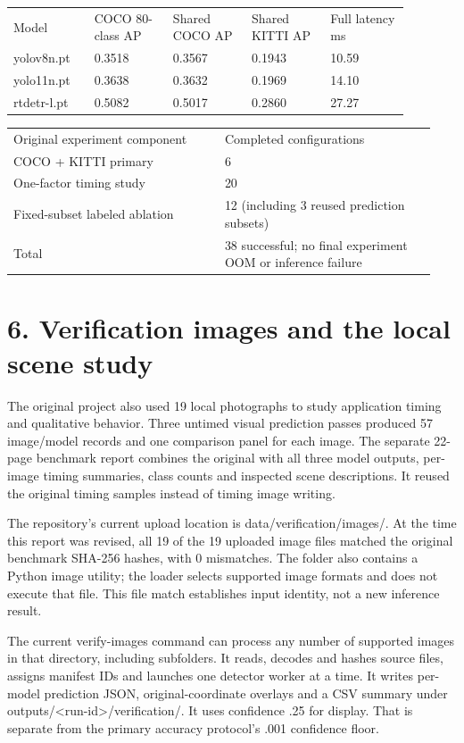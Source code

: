 \documentclass[10pt]{article}
\begin{document}
\begin{longtable}{p{0.176\linewidth}p{0.176\linewidth}p{0.176\linewidth}p{0.176\linewidth}p{0.176\linewidth}}
Model & COCO 80-class AP & Shared COCO AP & Shared KITTI AP & Full latency ms \\
yolov8n.pt & 0.3518 & 0.3567 & 0.1943 & 10.59 \\
yolo11n.pt & 0.3638 & 0.3632 & 0.1969 & 14.10 \\
rtdetr-l.pt & 0.5082 & 0.5017 & 0.2860 & 27.27 \\
\end{longtable}
\begin{longtable}{p{0.470\linewidth}p{0.470\linewidth}}
Original experiment component & Completed configurations \\
COCO + KITTI primary & 6 \\
One-factor timing study & 20 \\
Fixed-subset labeled ablation & 12 (including 3 reused prediction subsets) \\
Total & 38 successful; no final experiment OOM or inference failure \\
\end{longtable}
\clearpage
\section*{6. Verification images and the local scene study}
The original project also used 19 local photographs to study application timing and qualitative behavior. Three untimed visual prediction passes produced 57 image/model records and one comparison panel for each image. The separate 22-page benchmark report combines the original with all three model outputs, per-image timing summaries, class counts and inspected scene descriptions. It reused the original timing samples instead of timing image writing.


The repository's current upload location is data/verification/images/. At the time this report was revised, all 19 of the 19 uploaded image files matched the original benchmark SHA-256 hashes, with 0 mismatches. The folder also contains a Python image utility; the loader selects supported image formats and does not execute that file. This file match establishes input identity, not a new inference result.


The current verify-images command can process any number of supported images in that directory, including subfolders. It reads, decodes and hashes source files, assigns manifest IDs and launches one detector worker at a time. It writes per-model prediction JSON, original-coordinate overlays and a CSV summary under outputs/<run-id>/verification/. It uses confidence .25 for display. That is separate from the primary accuracy protocol's .001 confidence floor.
\end{document}
